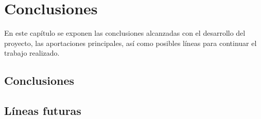 \chapter{Conclusiones}\label{cap.conclusiones}
En este capítulo se exponen las conclusiones alcanzadas con el desarrollo del proyecto, las aportaciones principales, así como posibles líneas para continuar el trabajo realizado.

\section{Conclusiones}

\section{Líneas futuras}
